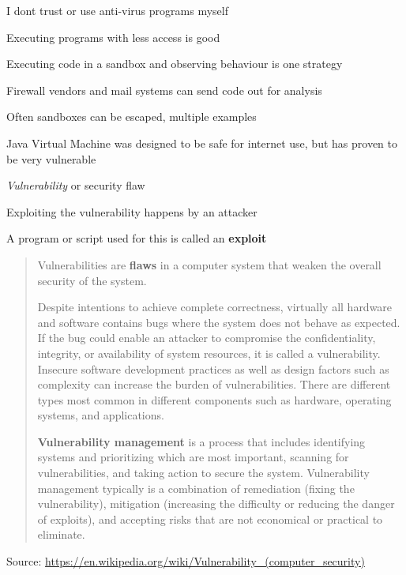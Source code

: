 \documentclass[Screen16to9,17pt]{foils}
\begin{document}
\centerline{I dont trust or use anti-virus programs myself}



\begin{list1}
\item Executing programs with less access is good
\item Executing code in a sandbox and observing behaviour is one strategy
\item Firewall vendors and mail systems can send code out for analysis
\item Often sandboxes can be escaped, multiple examples
\item Java Virtual Machine was designed to be safe for internet use, but has proven to be very vulnerable
\end{list1}










\begin{list1}
\item \emph{Vulnerability} or security flaw
\item Exploiting the vulnerability happens by an attacker
\item A program or script used for this is called an {\bf exploit}
\end{list1}





\begin{quote}
Vulnerabilities are {\bf flaws} in a computer system that weaken the overall security of the system.

Despite intentions to achieve complete correctness, virtually all hardware and software contains bugs where the system does not behave as expected. If the bug could enable an attacker to compromise the confidentiality, integrity, or availability of system resources, it is called a vulnerability. Insecure software development practices as well as design factors such as complexity can increase the burden of vulnerabilities. There are different types most common in different components such as hardware, operating systems, and applications.

{\bf Vulnerability management} is a process that includes identifying systems and prioritizing which are most important, scanning for vulnerabilities, and taking action to secure the system. Vulnerability management typically is a combination of remediation (fixing the vulnerability), mitigation (increasing the difficulty or reducing the danger of exploits), and accepting risks that are not economical or practical to eliminate.
\end{quote}
Source: \url{https://en.wikipedia.org/wiki/Vulnerability_(computer_security)}
\end{document}
